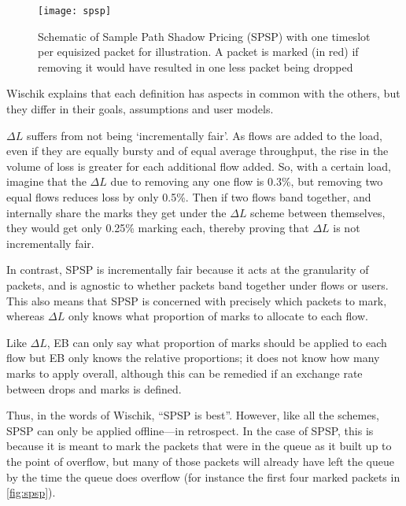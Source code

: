 \begin{figure}[h]
	\centering
	\texttt{[image: spsp]}
	\caption{Schematic of Sample Path Shadow Pricing (SPSP) with one timeslot per equisized packet for illustration. A packet is marked (in red) if removing it would have resulted in one less packet being dropped}\label{fig:spsp}
\end{figure}

Wischik explains that each definition has aspects in common with the others, but they differ in their goals, assumptions and user models. 

\(\Delta{L}\) suffers from not being `incrementally fair'. As flows are added to the load, even if they are equally bursty and of equal average throughput, the rise in the volume of loss is greater for each additional flow added. So, with a certain load, imagine that the \(\Delta{L}\) due to removing any one flow is 0.3\%, but removing two equal flows reduces loss by only 0.5\%. Then if two flows band together, and internally share the marks they get under the \(\Delta{L}\) scheme between themselves, they would get only 0.25\% marking each, thereby proving that \(\Delta{L}\) is not incrementally fair.

In contrast, SPSP is incrementally fair because it acts at the granularity of packets, and is agnostic to whether packets band together under flows or users. This also means that SPSP is concerned with precisely which packets to mark, whereas \(\Delta{L}\) only knows what proportion of marks to allocate to each flow.

Like \(\Delta{L}\), EB can only say what proportion of marks should be applied to each flow but EB only knows the relative proportions; it does not know how many marks to apply overall, although this can be remedied if an exchange rate between drops and marks is defined. 

Thus, in the words of Wischik, ``SPSP is best''. However, like all the schemes, SPSP can only be applied offline---in retrospect. In the case of SPSP, this is because it is meant to mark the packets that were in the queue as it built up to the point of overflow, but many of those packets will already have left the queue by the time the queue does overflow (for instance the first four marked packets in \autoref{fig:spsp}).

